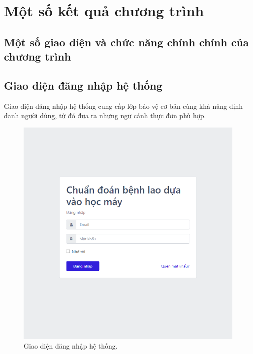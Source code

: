 \section{Một số kết quả chương trình}
\subsection{Một số giao diện và chức năng chính chính của chương trình}
\subsection{Giao diện đăng nhập hệ thống}
Giao diện đăng nhập hệ thống cung cấp lớp bảo vệ cơ bản cùng khả năng định danh người dùng, từ đó đưa ra nhưng ngữ cảnh thực đơn phù hợp.
\begin{figure}[H]
	\centering
	\includegraphics[width=1\linewidth]{images/giaodien_dangnhap}
	\caption{Giao diện đăng nhập hệ thống.}
	\label{fig:giaodien_dangnhap}
\end{figure}

